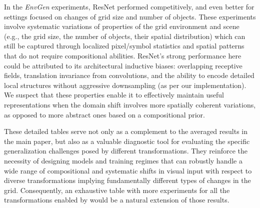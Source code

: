 In the \textit{EnvGen} experiments, ResNet performed competitively, and even better for settings focused on changes of grid size and number of objects. These experiments involve systematic variations of properties of the grid environment and scene (e.g., the grid size, the number of objects, their spatial distribution) which can still be captured through localized pixel/symbol statistics and spatial patterns that do not require compositional abilities. ResNet's strong performance here could be attributed to its architectural inductive biases: overlapping receptive fields, translation invariance from convolutions, and the ability to encode detailed local structures without aggressive downsampling (as per our implementation). We suspect that these properties enable it to effectively maintain useful representations when the domain shift involves more spatially coherent variations, as opposed to more abstract ones based on a compositional prior.

These detailed tables serve not only as a complement to the averaged results in the main paper, but also as a valuable diagnostic tool for evaluating the specific generalization challenges posed by different transformations. They reinforce the necessity of designing models and training regimes that can robustly handle a wide range of compositional and systematic shifts in visual input with respect to diverse transformations implying fundamentally different types of changes in the grid. Consequently, an exhaustive table with more experiments for all the transformations enabled by \generatorName \; would be a natural extension of those results.


